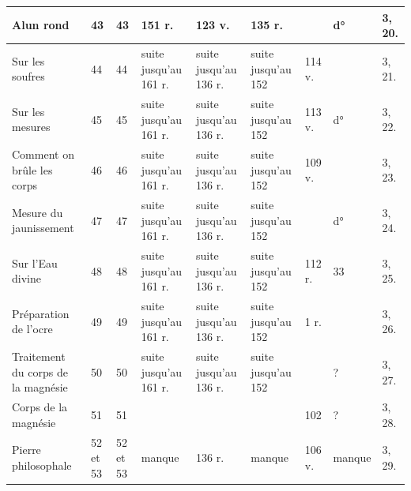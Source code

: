 \documentclass[a4paper, 11pt, oneside, polutonikogreek, french]{article}
\begin{document}
\begin{center}
\begin{longtable}{|p{20mm}|p{11mm}|p{11mm}|p{11mm}|p{11mm}|p{11mm}|p{11mm}|p{11mm}|p{15mm}|}
        Alun rond & 43 & 43 & 151 r. & 123 v. & 135 r. & ~ & d° & 3, 20. \\ \hline
        Sur les soufres & 44 & 44 & suite jusqu'au 161 r. & suite jusqu'au 136 r. & suite jusqu'au 152 & 114 v. & ~ & 3, 21. \\ \hline
        Sur les mesures & 45 & 45 & suite jusqu'au 161 r. & suite jusqu'au 136 r. & suite jusqu'au 152 & 113 v. & d° & 3, 22. \\ \hline
        Comment on brûle les corps & 46 & 46 & suite jusqu'au 161 r. & suite jusqu'au 136 r. & suite jusqu'au 152 & 109 v. & ~ & 3, 23. \\ \hline
        Mesure du jaunissement & 47 & 47 & suite jusqu'au 161 r. & suite jusqu'au 136 r. & suite jusqu'au 152 & ~ & d° & 3, 24. \\ \hline
        Sur l'Eau divine & 48 & 48 & suite jusqu'au 161 r. & suite jusqu'au 136 r. & suite jusqu'au 152 & 112 r. & 33 & 3, 25. \\ \hline
        Préparation de l'ocre & 49 & 49 & suite jusqu'au 161 r. & suite jusqu'au 136 r. & suite jusqu'au 152 & 1 r. & ~ & 3, 26. \\ \hline
        Traitement du corps de la magnésie & 50 & 50 & suite jusqu'au 161 r. & suite jusqu'au 136 r. & suite jusqu'au 152 & ~ & ? & 3, 27. \\ \hline
        Corps de la magnésie & 51 & 51 & ~ & ~ & ~ & 102 & ? & 3, 28. \\ \hline
        Pierre philosophale & 52 et 53 & 52 et 53 & manque & 136 r. & manque & 106 v. & manque & 3, 29. \\ \hline
    \end{longtable}
\end{center}
\end{document}
